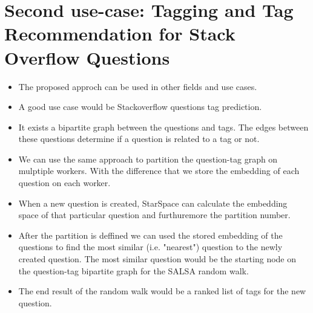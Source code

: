 \section{Second use-case: Tagging and Tag Recommendation for Stack Overflow Questions}
\label{sec:second-usecase}


\begin{itemize}
    \item The proposed approch can be used in other fields and use cases.
    \item A good use case would be Stackoverflow questions tag prediction.
    \item It exists a bipartite graph between the questions and tags. The edges between these questions determine if a question is related to a tag or not.
    \item We can use the same approach to partition the question-tag graph on mulptiple workers. With the difference that we store the embedding of each question on each worker.
    \item When a new question is created, StarSpace can calculate the embedding space of that particular question and furthuremore the partition number.
    \item After the partition is deffined we can used the stored embedding of the questions to find the most similar (i.e. "nearest") question to the newly created question. The most similar question would be the starting node on the question-tag bipartite graph for the SALSA random walk.
    \item The end result of the random walk would be a ranked list of tags for the new question.
\end{itemize}
